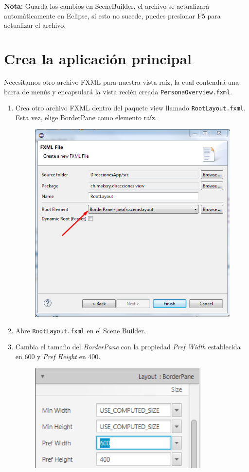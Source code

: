 \begin{enumerate}
	\begin{tcolorbox}[leftrule=3mm]
		\textbf{Nota:} Guarda los cambios en SceneBuilder, el archivo se actualizará automáticamente en Eclipse, si esto no sucede, puedes presionar F5 para actualizar el archivo.
	\end{tcolorbox}

\end{enumerate}

\section{Crea la aplicación principal}
Necesitamos otro archivo FXML para nuestra vista raíz, la cual contendrá una barra de menús y encapsulará la vista recién creada \textcolor{codigo}{\texttt{PersonaOverview.fxml}}.
\begin{enumerate}
	\item Crea otro archivo FXML dentro del paquete view llamado \textcolor{codigo}{\texttt{RootLayout.fxml}}. Esta vez, elige BorderPane como elemento raíz.
	\begin{figure}[H]
		\includegraphics[width=11cm]{img/rootLayout}
	\end{figure}
	\item Abre \textcolor{codigo}{\texttt{RootLayout.fxml}} en el Scene Builder.
	\item Cambia el tamaño del \textit{BorderPane} con la propiedad \textit{\textit{Pref Width}} establecida en 600 y \textit{Pref Height} en 400.
	\begin{figure}[H]
		\includegraphics[width=9cm]{img/rootLayoutSize}

\end{figure}
\end{enumerate}
